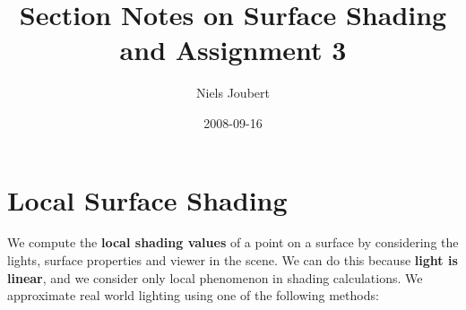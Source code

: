 \documentclass[]{article}
\title{Section Notes on Surface Shading and Assignment 3}
\author{ Niels Joubert }
\date{2008-09-16}
\begin{document}
\ifpdf
{}
\else
{}
\fi

\maketitle

\section{Local Surface Shading}

We compute the \textbf{local shading values} of a point on a surface by considering the lights, surface properties and viewer in the scene. We can do this because \textbf{light is linear}, and we consider only local phenomenon in shading calculations. We approximate real world lighting using one of the following methods:
\end{document}

